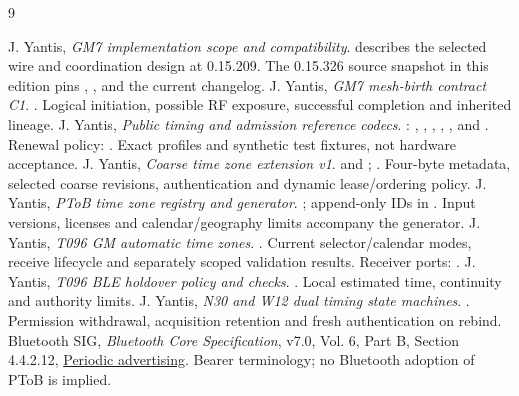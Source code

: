 \documentclass[11pt,letterpaper]{article}
\begin{document}
\page
\begin{thebibliography}{9}\small\raggedright
{} J. Yantis, \emph{GM7 implementation scope and compatibility}.  describes the selected wire and coordination design at 0.15.209. The 0.15.326 source snapshot in this edition pins , , and the current changelog.
 J. Yantis, \emph{GM7 mesh-birth contract C1}. . Logical initiation, possible RF exposure, successful completion and inherited lineage.
 J. Yantis, \emph{Public timing and admission reference codecs}. : , , , , , and . Renewal policy: . Exact profiles and synthetic test fixtures, not hardware acceptance.
 J. Yantis, \emph{Coarse time zone extension v1}.  and ; . Four-byte metadata, selected coarse revisions, authentication and dynamic lease/ordering policy.
 J. Yantis, \emph{PToB time zone registry and generator}. ; append-only IDs in . Input versions, licenses and calendar/geography limits accompany the generator.
 J. Yantis, \emph{T096 GM automatic time zones}. . Current selector/calendar modes, receive lifecycle and separately scoped validation results. Receiver ports: .
 J. Yantis, \emph{T096 BLE holdover policy and checks}. . Local estimated time, continuity and authority limits.
 J. Yantis, \emph{N30 and W12 dual timing state machines}. . Permission withdrawal, acquisition retention and fresh authentication on rebind.
 Bluetooth SIG, \emph{Bluetooth Core Specification}, v7.0, Vol. 6, Part B, Section 4.4.2.12, \href{https://www.bluetooth.com/wp-content/uploads/Files/Specification/HTML/Core_v7.0/out/en/low-energy-controller/linklayer-ll--specification.html}{Periodic advertising}. Bearer terminology; no Bluetooth adoption of PToB is implied.
\end{thebibliography}
\end{document}
